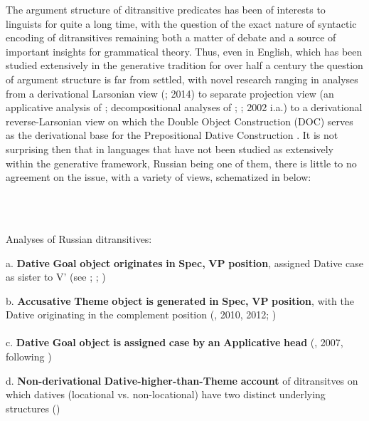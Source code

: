 \documentclass[output=paper,modfonts, nonflat]{langsci/langscibook}
\begin{document}
The argument structure of ditransitive predicates has been of interests to linguists for quite a long time, with the question of the exact nature of syntactic encoding of ditransitives remaining both a matter of debate and a source of important insights for grammatical theory. Thus, even in English, which has been studied extensively in the generative tradition for over half a century the question of argument structure is far from settled, with novel research ranging in analyses from a derivational Larsonian view (\citealt{Larson1988}; 2014) to separate projection view (an applicative analysis of \citealt{Marantz1993}; decompositional analyses of \citealt{Pesetsky1995}; \citealt{Harley1995}; 2002 i.a.) to a derivational reverse-Larsonian view on which the Double Object Construction (DOC) serves as the derivational base for the Prepositional Dative Construction \citep{Hallman2015}. It is not surprising then that in languages that have not been studied as extensively within the generative framework, Russian being one of them, there is little to no agreement on the issue, with a variety of views, schematized in  below:

\ea%
    \label{ex:key:1}
    \gll\\
        \\
    \glt
    \z

         Analyses of Russian ditransitives:

a. \textbf{Dative} \textbf{Goal} \textbf{object} \textbf{originates} \textbf{in} \textbf{Spec,} \textbf{VP} \textbf{position}, assigned Dative case as sister to V’ (see \citealt{HarbertToribio1991}; \citealt{GreenbergFranks1991}; \citealt{Franks1995} \citealt{Richardson2007})

b. \textbf{Accusative} \textbf{Theme} \textbf{object} \textbf{is} \textbf{generated} \textbf{in} \textbf{Spec,} \textbf{VP} \textbf{position}, with the Dative originating in the complement position (\citealt{Bailyn1995}, 2010, 2012; \citealt{Titov2017})\\
\\
c. \textbf{Dative} \textbf{Goal} \textbf{object} \textbf{is} \textbf{assigned} \textbf{case} \textbf{by} \textbf{an} \textbf{Applicative} \textbf{head} (\citealt{Dyakonova2005}, 2007, following \citealt{Pylkkänen2002})

d. \textbf{Non-derivational} \textbf{Dative-higher-than-Theme} \textbf{account} of ditransitves on which datives (locational vs. non-locational) have two distinct underlying structures (\citealt{BonehNash2017})
\end{document}
